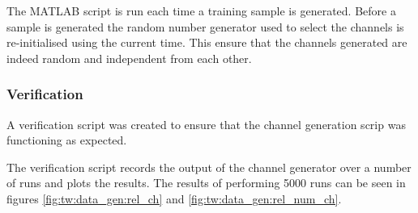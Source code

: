 The MATLAB script is run each time a training sample is generated. Before a sample is generated the random number generator used to select the channels is re-initialised using the current time. This ensure that the channels generated are indeed random and independent from each other. 



\subsubsection{Verification}

A verification script was created to ensure that the channel generation scrip was functioning as expected.

The verification script records the output of the channel generator over a number of runs and plots the results. The results of performing 5000 runs can be seen in figures \ref{fig:tw:data_gen:rel_ch} and \ref{fig:tw:data_gen:rel_num_ch}. 

